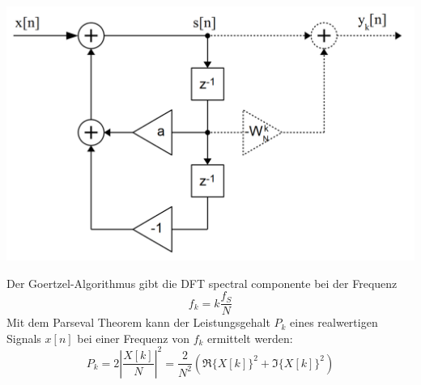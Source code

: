 \begin{center}
	\includegraphics[scale=.7]{../fig/goertzel}
\end{center}
Der Goertzel-Algorithmus gibt die DFT spectral componente bei der Frequenz
\[ f_k = k\frac{f_S}{N} \]
Mit dem Parseval Theorem kann der Leistungsgehalt $P_k$ eines realwertigen
Signals $x[n]$ bei einer Frequenz von $f_k$ ermittelt werden:
\[
	P_k = 2\left| \frac{X[k]}{N} \right|^2
		= \frac{2}{N^2}(\Re\{X[k]\}^2+\Im\{X[k]\}^2)
\]

